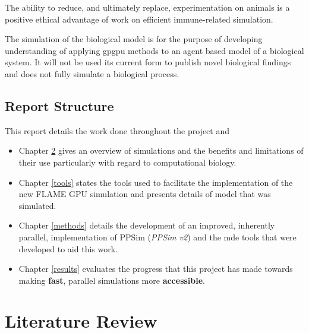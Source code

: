 \documentclass{UoYCSproject}
\begin{document}
The ability to reduce, and ultimately replace, experimentation on animals is a positive ethical advantage of work on efficient immune-related simulation.

The simulation of the biological model is for the purpose of developing understanding of applying \gls{gpgpu} methods to an agent based model of a biological system. It will not be used its current form to publish novel biological findings and does not fully simulate a biological process.

\section{Report Structure}
This report details the work done throughout the project and 

\begin{itemize}
    \item Chapter \ref{lit_review} gives an overview of simulations and the benefits and limitations of their use particularly with regard to computational biology.
    \item Chapter \ref{tools} states the tools used to facilitate the implementation of the new \gls{FLAME GPU} simulation and presents details of model that was simulated.
    \item Chapter \ref{methods} details the development of an improved, inherently parallel, implementation of PPSim (\textit{PPSim v2}) and the \gls{mde} tools that were developed to aid this work.
    \item Chapter \ref{results} evaluates the progress that this project has made towards making \textbf{fast}, parallel simulations more \textbf{accessible}.
\end{itemize}

\chapter{Literature Review}
\label{lit_review}
%
\end{document}
